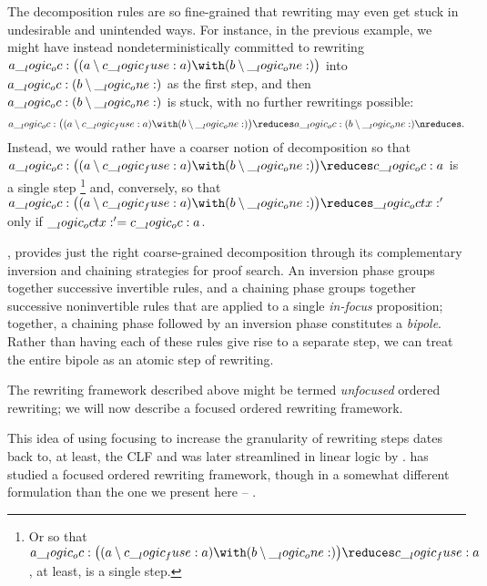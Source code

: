 The decomposition rules are so fine-grained that rewriting may even get stuck in undesirable and unintended ways.
For instance, in the previous example, we might have instead nondeterministically committed to rewriting $a \oc \bigl((a \limp c \fuse a) \with (b \limp \one)\bigr)$ into $a \__logic_oc: (b \mathbin { \setminus } \__logic_one:)$ as the first step, and then $a \__logic_oc: (b \mathbin { \setminus } \__logic_one:)$ is stuck, with no further rewritings possible:
\begin{equation*}
  a \oc \bigl((a \limp c \fuse a) \with (b \limp \one)\bigr)
    \reduces a \oc (b \limp \one)
    \nreduces
    \!\,.
\end{equation*}
Instead, we would rather have a coarser notion of decomposition so that $a \oc \bigl((a \limp c \fuse a) \with (b \limp \one)\bigr) \reduces c \oc a$ is a single step%
\footnote{Or so that $a \oc \bigl((a \limp c \fuse a) \with (b \limp \one)\bigr) \reduces c \fuse a$, at least, is a single step.}
and, conversely, so that $a \oc \bigl((a \limp c \fuse a) \with (b \limp \one)\bigr) \reduces \octx'$ only if $\__logic_octx:' = c \__logic_oc: a$.

 , provides just the right coarse-grained decomposition through its complementary inversion and chaining strategies for proof search.
An inversion phase groups together successive invertible rules, and a chaining phase groups together successive noninvertible rules that are applied to a single \emph{in-focus} proposition;
together, a chaining phase followed by an inversion phase constitutes a \emph{bipole}.
Rather than having each of these rules give rise to a separate step, we can treat the entire bipole as an atomic step of rewriting.

The rewriting framework described above might be termed \emph{unfocused} ordered rewriting; we will now describe a focused ordered rewriting framework.

This idea of using focusing to increase the granularity of rewriting steps dates back to, at least, the \acf{CLF}\autocite{Watkins+:CMU02} and was later streamlined in linear logic by .
 has studied a focused ordered rewriting framework, though in a somewhat different formulation than the one we present here -- .


